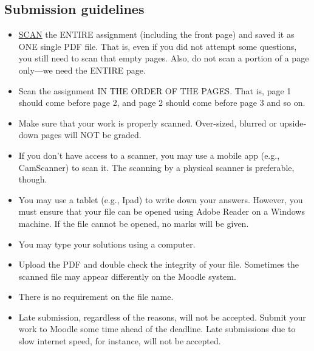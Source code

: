 \documentclass[11pt]{article}   %
\renewcommand\baselinestretch{1.0}\selectfont
\begin{document}
\subsection*{Submission guidelines}
\begin{itemize}
\item \underline{SCAN} the ENTIRE assignment (including the front page) and saved it as ONE single PDF file. That is, even if you did not attempt some questions, you still need to scan that empty pages. Also, do not scan a portion of a page only---we need the ENTIRE page. 
\item Scan the assignment IN THE ORDER OF THE PAGES. That is, page 1 should come before page 2, and page 2 should come before page 3 and so on. 
\item Make sure that your work is properly scanned. Over-sized, blurred or upside-down pages will NOT be graded.
\item If you don’t have access to a scanner, you may use a mobile app (e.g., CamScanner) to scan it. The scanning by a physical scanner is preferable, though.  
\item You may use a tablet (e.g., Ipad) to write down your answers. However, you must ensure that your file can be opened using Adobe Reader on a Windows machine. If the file cannot be opened, no marks will be given. %
\item You may type your solutions using a computer.
\item Upload the PDF and double check the integrity of your file. Sometimes the scanned file may appear differently on the Moodle system.
\item There is no requirement on the file name. 
\item Late submission, regardless of the reasons, will not be accepted. Submit your work to Moodle some time ahead of the deadline. Late submissions due to slow internet speed, for instance, will not be accepted.
\end{itemize}
\newpage
\end{document}
